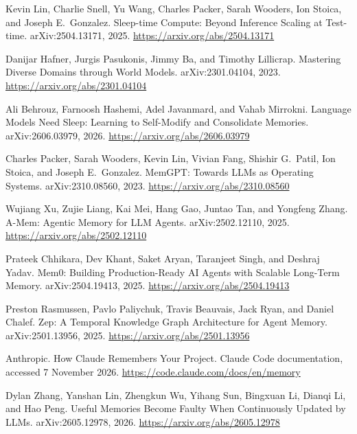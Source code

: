 Kevin Lin, Charlie Snell, Yu Wang, Charles Packer, Sarah Wooders, Ion Stoica, and Joseph E.\ Gonzalez.
\newblock Sleep-time Compute: Beyond Inference Scaling at Test-time.
\newblock arXiv:2504.13171, 2025.
\newblock \url{https://arxiv.org/abs/2504.13171}

Danijar Hafner, Jurgis Pasukonis, Jimmy Ba, and Timothy Lillicrap.
\newblock Mastering Diverse Domains through World Models.
\newblock arXiv:2301.04104, 2023.
\newblock \url{https://arxiv.org/abs/2301.04104}

Ali Behrouz, Farnoosh Hashemi, Adel Javanmard, and Vahab Mirrokni.
\newblock Language Models Need Sleep: Learning to Self-Modify and Consolidate Memories.
\newblock arXiv:2606.03979, 2026.
\newblock \url{https://arxiv.org/abs/2606.03979}

Charles Packer, Sarah Wooders, Kevin Lin, Vivian Fang, Shishir G.\ Patil, Ion Stoica, and Joseph E.\ Gonzalez.
\newblock MemGPT: Towards LLMs as Operating Systems.
\newblock arXiv:2310.08560, 2023.
\newblock \url{https://arxiv.org/abs/2310.08560}

Wujiang Xu, Zujie Liang, Kai Mei, Hang Gao, Juntao Tan, and Yongfeng Zhang.
\newblock A-Mem: Agentic Memory for LLM Agents.
\newblock arXiv:2502.12110, 2025.
\newblock \url{https://arxiv.org/abs/2502.12110}

Prateek Chhikara, Dev Khant, Saket Aryan, Taranjeet Singh, and Deshraj Yadav.
\newblock Mem0: Building Production-Ready AI Agents with Scalable Long-Term Memory.
\newblock arXiv:2504.19413, 2025.
\newblock \url{https://arxiv.org/abs/2504.19413}

Preston Rasmussen, Pavlo Paliychuk, Travis Beauvais, Jack Ryan, and Daniel Chalef.
\newblock Zep: A Temporal Knowledge Graph Architecture for Agent Memory.
\newblock arXiv:2501.13956, 2025.
\newblock \url{https://arxiv.org/abs/2501.13956}

Anthropic.
\newblock How Claude Remembers Your Project.
\newblock Claude Code documentation, accessed 7 November 2026.
\newblock \url{https://code.claude.com/docs/en/memory}

Dylan Zhang, Yanshan Lin, Zhengkun Wu, Yihang Sun, Bingxuan Li, Dianqi Li, and Hao Peng.
\newblock Useful Memories Become Faulty When Continuously Updated by LLMs.
\newblock arXiv:2605.12978, 2026.
\newblock \url{https://arxiv.org/abs/2605.12978}

